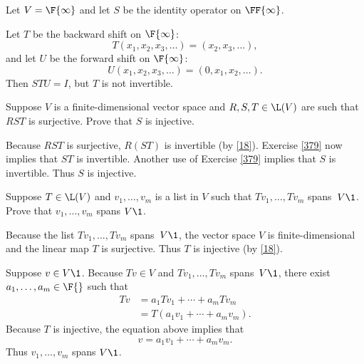 \begin{Solution}
Let $V = \F{\infty}$ and let $S$ be the identity operator on $\FF{\infty}$.

Let $T$ be the backward shift on $\F{\infty}$:
\[
T(x_1, x_2, x_3, \dotsc) = (x_2, x_3, \dotsc),
\]
and let $U$ be the forward shift on $\F{\infty}$:
\[
U(x_1, x_2, x_3, \dotsc) = (0, x_1, x_2, \dotsc).
\]
Then $STU = I$, but $T$ is not invertible.
\end{Solution}

\exercise
Suppose $V$ is a finite-dimensional vector space and $R, S, T \in
\L(V)$ are such that $RST$ is surjective.  Prove
that $S$ is  injective.

\begin{Solution}
Because $RST$ is surjective, $R(ST)$ is invertible (by \ref{18}). Exercise \ref{379} now implies that $ST$ is invertible. Another use of Exercise \ref{379} implies that $S$ is invertible. Thus $S$ is injective.
\end{Solution}

\exercise
Suppose $T \in \L(V)$ and $v_1, \dots, v_m$ is a list in $V$ such that $Tv_1, \dots, Tv_m$ spans~$V\1$. Prove that
$v_1, \dots, v_m$ spans $V\1$.

\begin{Solution}
Because the list $Tv_1, \dots, Tv_m$ spans~$V\1$, the vector space $V$ is finite-dimensional and the linear map $T$ is surjective. Thus $T$ is injective (by \ref{18}).

Suppose $v \in V\1$. Because $Tv \in V$ and $Tv_1, \dots, Tv_m$ spans~$V\1$, there exist $a_1, \ldots, a_m \in \F{}$ such that
\begin{align*}
Tv &= a_1 Tv_1 + \cdots + a_m Tv_m \\[3bp]
&= T( a_1 v_1 + \cdots + a_m v_m ).
\end{align*}
Because $T$ is injective, the equation above implies that
\[
v = a_1 v_1 + \cdots + a_m v_m.
\]
Thus $v_1, \dots, v_m$ spans $V\1$.
\end{Solution}

